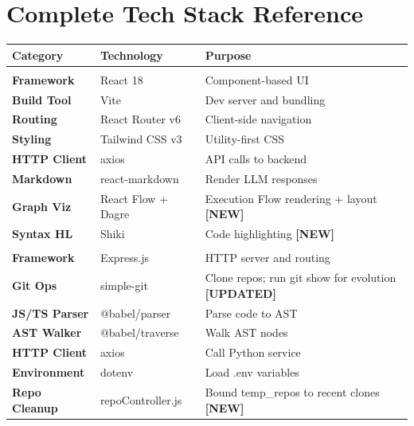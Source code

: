 \documentclass[a4paper,11pt]{article}
\begin{document}
\newpage

\section{Complete Tech Stack Reference}

\vspace{6pt}
\begin{center}
\begin{tabularx}{0.96\textwidth}{@{}>{\bfseries}lll@{}}
\toprule
\textbf{Category} & \textbf{Technology} & \textbf{Purpose} \\
\midrule
\multicolumn{3}{@{}l}{\textit{\small\color{accentblue} Frontend}} \\[2pt]
Framework    & React 18           & Component-based UI \\
Build Tool   & Vite               & Dev server and bundling \\
Routing      & React Router v6    & Client-side navigation \\
Styling      & Tailwind CSS v3    & Utility-first CSS \\
HTTP Client  & axios              & API calls to backend \\
Markdown     & react-markdown     & Render LLM responses \\
Graph Viz    & React Flow + Dagre & Execution Flow rendering + layout \textbf{[NEW]} \\
Syntax HL    & Shiki              & Code highlighting \textbf{[NEW]} \\
\midrule
\multicolumn{3}{@{}l}{\textit{\small\color{accentblue} Node.js Backend}} \\[2pt]
Framework    & Express.js         & HTTP server and routing \\
Git Ops      & simple-git         & Clone repos; run git show for evolution \textbf{[UPDATED]} \\
JS/TS Parser & @babel/parser      & Parse code to AST \\
AST Walker   & @babel/traverse    & Walk AST nodes \\
HTTP Client  & axios              & Call Python service \\
Environment  & dotenv             & Load .env variables \\
Repo Cleanup & repoController.js  & Bound temp\_repos to recent clones \textbf{[NEW]} \\

\end{tabularx}
\end{center}
\end{document}
